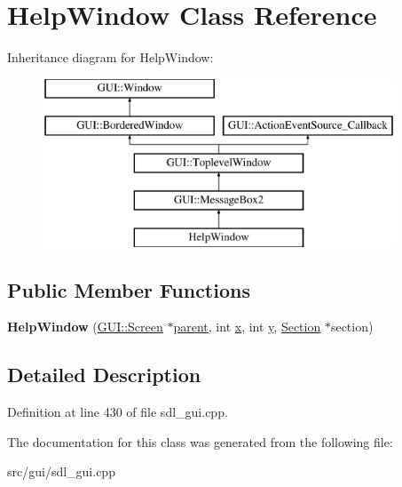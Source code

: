 \hypertarget{classHelpWindow}{\section{Help\-Window Class Reference}
\label{classHelpWindow}
}
Inheritance diagram for Help\-Window\-:\begin{figure}[H]
\begin{center}
\leavevmode
\includegraphics[height=5.000000cm]{classHelpWindow}
\end{center}
\end{figure}
\subsection*{Public Member Functions}
\begin{DoxyCompactItemize}
\item 
\hypertarget{classHelpWindow_a187ef189ba63c6c5ecf56aea58890d91}{{\bfseries Help\-Window} (\hyperlink{classGUI_1_1Screen}{G\-U\-I\-::\-Screen} $\ast$\hyperlink{classGUI_1_1Window_a2e593ff65e7702178d82fe9010a0b539}{parent}, int \hyperlink{classGUI_1_1Window_a6ca6a80ca00c9e1d8ceea8d3d99a657d}{x}, int \hyperlink{classGUI_1_1Window_a0ee8e923aff2c3661fc2e17656d37adf}{y}, \hyperlink{classSection}{Section} $\ast$section)}\label{classHelpWindow_a187ef189ba63c6c5ecf56aea58890d91}

\end{DoxyCompactItemize}


\subsection{Detailed Description}


Definition at line 430 of file sdl\-\_\-gui.\-cpp.



The documentation for this class was generated from the following file\-:\begin{DoxyCompactItemize}
\item 
src/gui/sdl\-\_\-gui.\-cpp\end{DoxyCompactItemize}
